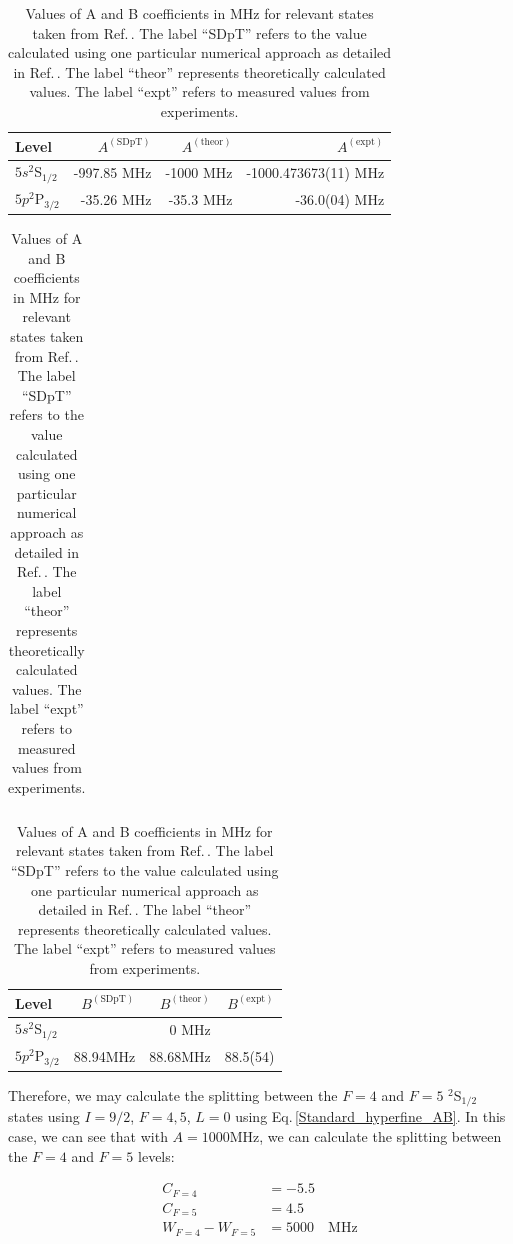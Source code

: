 \begin{table}[h]
\centering
\begin{tabular}{|l|r|r|r|}
\hline
Level &  $A^{\mathrm{(SDpT)}}$ &$A^{\mathrm{(theor)}}$ & $A^{\mathrm{(expt)}}$ \\ \hline \hline
$5s ^2$S$_{1/2}$&-997.85 MHz& -1000 MHz& -1000.473673(11) MHz\\ \hline
$5p ^2$P$_{3/2}$&-35.26 MHz&-35.3 MHz&-36.0(04) MHz\\ \hline
\end{tabular}

\begin{tabular}{l}
\end{tabular}

\begin{tabular}{|l|r|r|r|}
\hline
Level &  $B^{\mathrm{(SDpT)}}$ &$B^{\mathrm{(theor)}}$ & $B^{\mathrm{(expt)}}$ \\ \hline \hline
$5s ^2$S$_{1/2}$&&0  MHz&  \\ \hline
$5p ^2$P$_{3/2}$&88.94MHz&$88.68$MHz\footnotemark&88.5(54) \\ \hline
\end{tabular}
\caption{Values of A and B coefficients in MHz for relevant states taken from Ref.\,\cite{safronova2photon}. The label ``SDpT'' refers to the value calculated using one particular numerical approach as detailed in Ref.\,\cite{safronova2photon}. The label ``theor'' represents theoretically calculated values. The label ``expt'' refers to measured values from experiments.\label{AB_table}
}
\end{table}

Therefore, we may calculate the splitting between the $F=4$ and $F=5$ $^2$S$_{1/2}$ states using $I=9/2$, $F=4,5$, $L=0$ using Eq.\,\ref{Standard_hyperfine_AB}. In this case, we can see that with $A=1000$MHz, we can calculate the splitting between the $F=4$ and $F=5$ levels: 

\begin{align}
C_{F=4} &= -5.5\\
C_{F=5} &= 4.5\\
W_{F=4}-W_{F=5}&=5000 \quad \mathrm{MHz}
\end{align}

